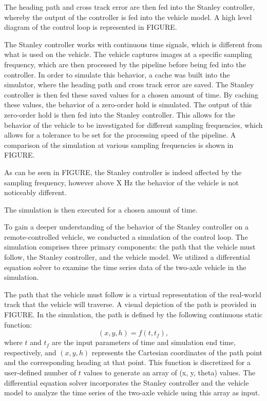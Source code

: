 \documentclass[arbeit=studie,oneside,BCOR=12mm]{ArbeitRST}
\begin{document}
The heading path and cross track error are then fed into the Stanley
controller, whereby the output of the controller is fed into the vehicle model.
A high level diagram of the control loop is represented in FIGURE.

The Stanley controller works with continuous time signals, which is different
from what is used on the vehicle. The vehicle captures images at a specific
sampling frequency, which are then processed by the pipeline before being fed
into the controller. In order to simulate this behavior, a cache was built into
the simulator, where the heading path and cross track error are saved. The
Stanley controller is then fed these saved values for a chosen amount of time.
By caching these values, the behavior of a zero-order hold is simulated. The
output of this zero-order hold is then fed into the Stanley controller. This
allows for the behavior of the vehicle to be investigated for different
sampling frequencies, which allows for a tolerance to be set for the processing
speed of the pipeline. A comparison of the simulation at various sampling
frequencies is shown in FIGURE.

As can be seen in FIGURE, the Stanley controller is indeed affected by the
sampling frequency, however above X Hz the behavior of the vehicle is not
noticeably different. 

The simulation is then executed for a chosen amount of time. 









To gain a deeper understanding of the behavior of the Stanley controller on a
remote-controlled vehicle, we conducted a simulation of the control loop. The
simulation comprises three primary components: the path that the vehicle must
follow, the Stanley controller, and the vehicle model. We utilized a
differential equation solver to examine the time series data of the two-axle
vehicle in the simulation.


The path that the vehicle must follow is a virtual representation of the
real-world track that the vehicle will traverse. A visual depiction of the path
is provided in FIGURE. In the simulation, the path is defined by the following
continuous static function:
\begin{equation}
  (x, y, h) = f(t, t_f),
\end{equation}
where $t$ and $t_f$ are the input parameters of time and simulation end time,
respectively, and $(x, y, h)$ represents the Cartesian coordinates of the path
point and the corresponding heading at that point. This function is discretized
for a user-defined number of $t$ values to generate an array of (x, y, theta)
values. The differential equation solver incorporates the Stanley controller
and the vehicle model to analyze the time series of the two-axle vehicle using
this array as input.
\end{document}

